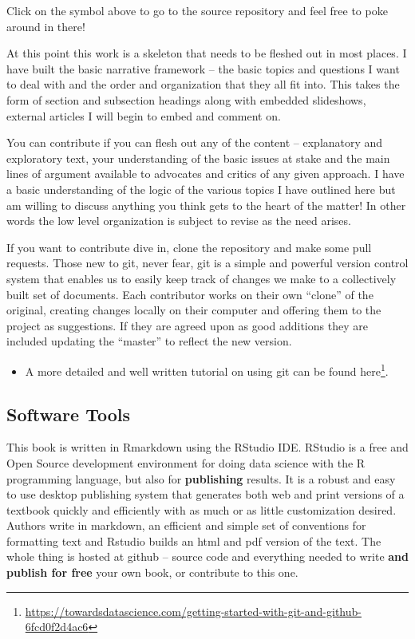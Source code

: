 \documentclass[
  12pt, openany]{book}
\makeatletter
\providecommand{\tightlist}{%
  \setlength{\itemsep}{0pt}\setlength{\parskip}{0pt}}
\renewcommand{\href}[2]{#2\footnote{\url{#1}}}
\newenvironment{kframe}{%
\medskip{}
\setlength{\fboxsep}{.8em}
 \def\at@end@of@kframe{}%
 \ifinner\ifhmode%
  \def\at@end@of@kframe{\end{minipage}}%
  \begin{minipage}{\columnwidth}%
 \fi\fi%
 \def\FrameCommand##1{\hskip\@totalleftmargin \hskip-\fboxsep
 \colorbox{shadecolor}{##1}\hskip-\fboxsep
     \hskip-\linewidth \hskip-\@totalleftmargin \hskip\columnwidth}%
 \MakeFramed {\advance\hsize-\width
   \@totalleftmargin\z@ \linewidth\hsize
   \@setminipage}}%
 {\par\unskip\endMakeFramed%
 \at@end@of@kframe}
\newenvironment{rmdblock}[1]
  {
  \begin{itemize}
  \renewcommand{\labelitemi}{
    \raisebox{-.7\height}[0pt][0pt]{
      {\setkeys{Gin}{width=3em,keepaspectratio}\texttt{[image: img/\#1]}}
    }
  }
  \setlength{\fboxsep}{1em}
  \begin{kframe}
  \item
  }
  {
  \end{kframe}
  \end{itemize}
  }
\newenvironment{important}
  {\begin{rmdblock}{important}}
  {\end{rmdblock}}
\makeatother
\begin{document}
\begin{important}

Click on the symbol above to go to the source repository and feel free to poke around in there!

\end{important}

At this point this work is a skeleton that needs to be fleshed out in most places. I have built the basic narrative framework -- the basic topics and questions I want to deal with and the order and organization that they all fit into. This takes the form of section and subsection headings along with embedded slideshows, external articles I will begin to embed and comment on.

You can contribute if you can flesh out any of the content -- explanatory and exploratory text, your understanding of the basic issues at stake and the main lines of argument available to advocates and critics of any given approach. I have a basic understanding of the logic of the various topics I have outlined here but am willing to discuss anything you think gets to the heart of the matter! In other words the low level organization is subject to revise as the need arises.

If you want to contribute dive in, clone the repository and make some pull requests. Those new to git, never fear, git is a simple and powerful version control system that enables us to easily keep track of changes we make to a collectively built set of documents. Each contributor works on their own ``clone'' of the original, creating changes locally on their computer and offering them to the project as suggestions. If they are agreed upon as good additions they are included updating the ``master'' to reflect the new version.

\begin{itemize}
\tightlist
\item
  A more detailed and well written tutorial \href{https://towardsdatascience.com/getting-started-with-git-and-github-6fcd0f2d4ac6}{on using git can be found here}.
\end{itemize}

\hypertarget{software-tools}{%
\subsection{Software Tools}\label{software-tools}}

This book is written in Rmarkdown using the RStudio IDE. RStudio is a free and Open Source development environment for doing data science with the R programming language, but also for \textbf{publishing} results. It is a robust and easy to use desktop publishing system that generates both web and print versions of a textbook quickly and efficiently with as much or as little customization desired. Authors write in markdown, an efficient and simple set of conventions for formatting text and Rstudio builds an html and pdf version of the text. The whole thing is hosted at github -- source code and everything needed to write \textbf{and publish for free} your own book, or contribute to this one.
\end{document}
